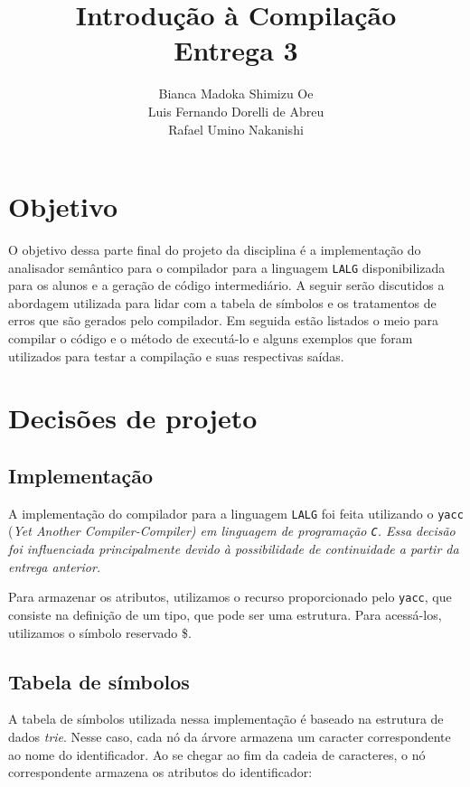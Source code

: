 \documentclass{article}
\title{Introdução à Compilação\\Entrega 3}
\author{Bianca Madoka Shimizu Oe\\
		Luis Fernando Dorelli de Abreu\\
		Rafael Umino Nakanishi}
\date{}
\begin{document}
\maketitle

\section{Objetivo} %
\label{sec:objetivo}
	O objetivo dessa parte final do projeto da disciplina é a implementação do analisador semântico para o compilador para a linguagem \verb=LALG= disponibilizada para os alunos e a geração de código intermediário. A seguir serão discutidos a abordagem utilizada para lidar com a tabela de símbolos e os tratamentos de erros que são gerados pelo compilador. Em seguida estão listados o meio para compilar o código e o método de executá-lo e alguns exemplos que foram utilizados para testar a compilação e suas respectivas saídas.


\section{Decisões de projeto} %
\label{sec:decisoes_de_projeto}
	\subsection{Implementação} %
	\label{sub:implementacao}
		A implementação do compilador para a linguagem \verb=LALG= foi feita utilizando o \verb=yacc= (\em Yet Another Compiler-Compiler\normalfont) em linguagem de programação \verb=C=. Essa decisão foi influenciada principalmente devido à possibilidade de continuidade a partir da entrega anterior. 

		Para armazenar os atributos, utilizamos o recurso proporcionado pelo \verb=yacc=, que consiste na definição de um tipo, que pode ser uma estrutura. Para acessá-los, utilizamos o símbolo reservado \$.
		

	\subsection{Tabela de símbolos} %
	\label{sub:tabela_de_simbolos}
		A tabela de símbolos utilizada nessa implementação é baseado na estrutura de dados \emph{trie}. Nesse caso, cada nó da árvore armazena um caracter correspondente ao nome do identificador. Ao se chegar ao fim da cadeia de caracteres, o nó correspondente armazena os atributos do identificador:
\end{document}
